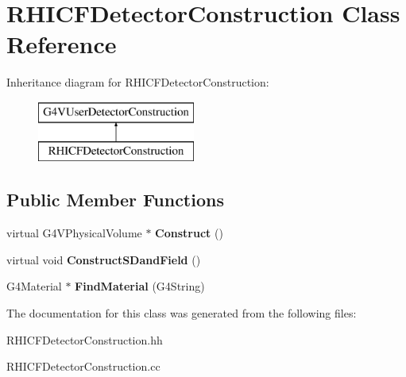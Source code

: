 \hypertarget{class_r_h_i_c_f_detector_construction}{}\section{R\+H\+I\+C\+F\+Detector\+Construction Class Reference}
\label{class_r_h_i_c_f_detector_construction}
Inheritance diagram for R\+H\+I\+C\+F\+Detector\+Construction\+:\begin{figure}[H]
\begin{center}
\leavevmode
\includegraphics[height=2.000000cm]{class_r_h_i_c_f_detector_construction}
\end{center}
\end{figure}
\subsection*{Public Member Functions}
\begin{DoxyCompactItemize}
\item 
\hypertarget{class_r_h_i_c_f_detector_construction_ac57e59ee13d87e7a6c6d46566139f431}{}virtual G4\+V\+Physical\+Volume $\ast$ {\bfseries Construct} ()\label{class_r_h_i_c_f_detector_construction_ac57e59ee13d87e7a6c6d46566139f431}

\item 
\hypertarget{class_r_h_i_c_f_detector_construction_a7a867fd39f284639fcca381f5d4e50b9}{}virtual void {\bfseries Construct\+S\+Dand\+Field} ()\label{class_r_h_i_c_f_detector_construction_a7a867fd39f284639fcca381f5d4e50b9}

\item 
\hypertarget{class_r_h_i_c_f_detector_construction_a9caa382d52787d0e95743197103061db}{}G4\+Material $\ast$ {\bfseries Find\+Material} (G4\+String)\label{class_r_h_i_c_f_detector_construction_a9caa382d52787d0e95743197103061db}

\end{DoxyCompactItemize}


The documentation for this class was generated from the following files\+:\begin{DoxyCompactItemize}
\item 
R\+H\+I\+C\+F\+Detector\+Construction.\+hh\item 
R\+H\+I\+C\+F\+Detector\+Construction.\+cc\end{DoxyCompactItemize}
